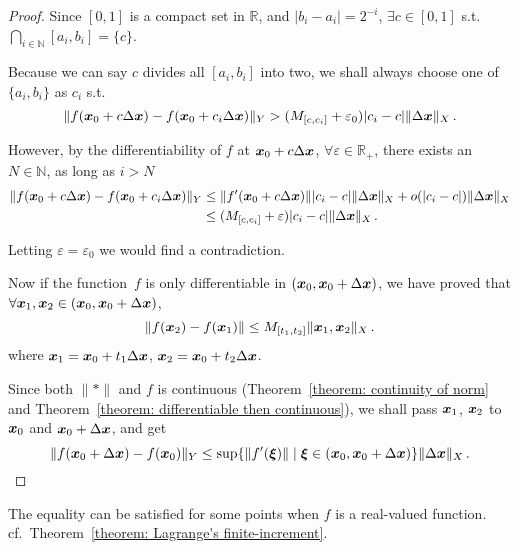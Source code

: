 \documentclass[openany]{book}
\begin{document}
\begin{proof}
	Since $[0, 1]$ is a compact set in $\mathbb R$, and $|b_i - a_i| = 2^{-i}$, $\exists c \in [0, 1]$ s.t.\ $\bigcap_{i \in \mathbb N} [a_i, b_i] = \{c\}$.

	Because we can say $c$ divides all $[a_i, b_i]$ into two, we shall always choose one of $\{a_i, b_i\}$ as $c_i$ s.t.\ 
	\begin{equation}\label{equation: inequality that violates differentiable}
		\|f(\boldsymbol{x}_0 + c \Delta \boldsymbol{x}) - f(\boldsymbol{x}_0 + c_i \Delta \boldsymbol{x})\|_Y
			> (M_{[c, c_i]} + \varepsilon_0) |c_i - c| \|\Delta \boldsymbol{x}\|_X\,.
	\end{equation}

	However, by the differentiability of $f$ at $\boldsymbol{x}_0 + c \Delta \boldsymbol{x}$, $\forall \varepsilon \in \mathbb R_+$, there exists an $N \in \mathbb N$, as long as $i > N$
	\begin{align*}
		\|f(\boldsymbol{x}_0 + c \Delta \boldsymbol{x}) - f(\boldsymbol{x}_0 + c_i \Delta \boldsymbol{x})\|_Y 
			&\leq \|f'(\boldsymbol{x}_0 + c\Delta \boldsymbol{x})\||c_i - c|\|\Delta \boldsymbol{x}\|_X
				+ o(|c_i - c|) \|\Delta \boldsymbol{x}\|_X
		\\
			&\leq (M_{[c, c_i]} + \varepsilon) |c_i - c|\|\Delta \boldsymbol{x}\|_X\,.
	\end{align*}

	Letting $\varepsilon = \varepsilon_0$ we would find a contradiction.

	Now if the function~$f$ is only differentiable in $(\boldsymbol{x}_0, \boldsymbol{x}_0 + \Delta \boldsymbol{x})$, we have proved that $\forall \boldsymbol{x}_1, \boldsymbol{x}_2 \in (\boldsymbol{x}_0, \boldsymbol{x}_0 + \Delta \boldsymbol{x})$, 
	\begin{equation*}
		\|f(\boldsymbol{x}_2) - f(\boldsymbol{x}_1)\| \leq M_{[t_1, t_2]} \|\boldsymbol{x}_1, \boldsymbol{x}_2\|_X\,.
	\end{equation*}
	where $\boldsymbol{x}_1 = \boldsymbol{x}_0 + t_1 \Delta \boldsymbol{x}$, $\boldsymbol{x}_2 = \boldsymbol{x}_0 + t_2 \Delta \boldsymbol{x}$.

	Since both $\|*\|$ and $f$ is continuous (Theorem~\ref{theorem: continuity of norm} and Theorem~\ref{theorem: differentiable then continuous}), we shall pass $\boldsymbol{x}_1$, $\boldsymbol{x}_2$ to $\boldsymbol{x}_0$ and $\boldsymbol{x}_0 + \Delta \boldsymbol{x}$, and get
	\begin{equation*}
		\|f(\boldsymbol{x}_0 + \Delta \boldsymbol{x}) - f(\boldsymbol{x}_0)\|_Y 
			\leq \sup \{\|f'(\boldsymbol{\xi})\|  \mid \boldsymbol{\xi} \in (\boldsymbol{x}_0, \boldsymbol{x}_0 + \Delta \boldsymbol{x})\} \|\Delta \boldsymbol{x}\|_X\,.
	\end{equation*}
\end{proof}

The equality can be satisfied for some points when $f$ is a real-valued function. 
cf.\ Theorem~\ref{theorem: Lagrange's finite-increment}.
\end{document}
